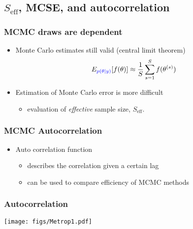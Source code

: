 \documentclass[10pt]{beamer}
\begin{document}


\subsection{$S_\text{eff}$, MCSE, and autocorrelation}
\frame{\subsectionpage}


\begin{frame}

\frametitle{MCMC draws are dependent}

  \begin{itemize}
    \item Monte Carlo estimates still valid (central limit theorem)
      \begin{align*}
        E_{\color{blue} p(\theta|y)}[f(\theta)] \approx \frac{1}{S} \sum_{s=1}^S f(\theta^{(s)})
      \end{align*}
    \item Estimation of Monte Carlo error is more difficult
      \begin{itemize}
        \item evaluation of {\it effective} sample size, $S_\text{eff}$.
      \end{itemize}
    \end{itemize}
\end{frame}

\begin{frame}

\frametitle{MCMC Autocorrelation}

  \begin{itemize}
  \item Auto correlation function
    \begin{itemize}
    \item describes the correlation given a certain lag
    \item can be used to compare efficiency of MCMC methods
    \end{itemize}
  \end{itemize}
\end{frame}

\begin{frame}

\frametitle{Autocorrelation}

  \vspace{-0.5\baselineskip}
  \texttt{[image: figs/Metrop1.pdf]}

\end{frame}
\end{document}
